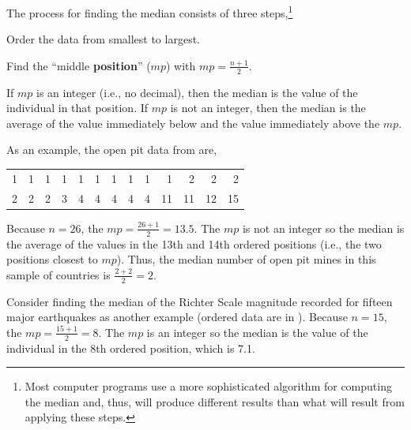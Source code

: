\documentclass[10pt,openany]{book}\usepackage[]{graphicx}\usepackage[]{color}
\begin{document}
The process for finding the median consists of three steps,\footnote{Most computer programs use a more sophisticated algorithm for computing the median and, thus, will produce different results than what will result from applying these steps.}
\vspace{-8pt}
\begin{Enumerate}
  \item Order the data from smallest to largest.
  \item Find the ``middle \textbf{position}'' ($mp$) with $mp=\frac{n+1}{2}$.
  \item If $mp$ is an integer (i.e., no decimal), then the median is the value of the individual in that position. If $mp$ is not an integer, then the median is the average of the value immediately below and the value immediately above the $mp$.
\end{Enumerate}

As an example, the open pit data from  are,

\begin{tabular}{rrrrrrrrrrrrr}
  1 & 1 & 1 & 1 & 1 & 1 & 1 & 1 & 1 & 1 & 2 & 2 & 2 \\ 
  2 & 2 & 2 & 3 & 4 & 4 & 4 & 4 & 4 & 11 & 11 & 12 & 15 \\ 
  \end{tabular}


Because $n=26$, the $mp=\frac{26+1}{2}=13.5$. The $mp$ is not an integer so the median is the average of the values in the 13th and 14th ordered positions (i.e., the two positions closest to $mp$). Thus, the median number of open pit mines in this sample of countries is $\frac{2+2}{2}=2$.

Consider finding the median of the Richter Scale magnitude recorded for fifteen major earthquakes as another example (ordered data are in ). Because $n=15$, the $mp=\frac{15+1}{2}=8$. The $mp$ is an integer so the median is the value of the individual in the 8th ordered position, which is 7.1.

\end{document}
